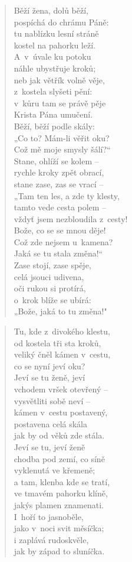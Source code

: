 \begin{verse}
Běží žena, dolů běží, \\
pospíchá do chrámu Páně: \\
tu nablízku lesní stráně \\
kostel na pahorku leží. \\
A~v~úvale ku potoku \\
náhle ubystřuje kroků; \\
neb jak větřík volně věje, \\
z~kostela slyšeti pění: \\
v~kůru tam se právě pěje \\
Krista Pána umučení. \\
Běží, běží podle skály: \\
„Co to? Mám-li věřit oku? \\
Což mě moje smysly šálí?“ \\
Stane, ohlíží se kolem -- \\
rychle kroky zpět obrací, \\
stane zase, zas se vrací -- \\
„Tam ten les, a zde ty klesty, \\
tamto vede cesta polem -- \\
vždyť jsem nezbloudila z~cesty! \\
Bože, co se se mnou děje! \\
Což zde nejsem u~kamena? \\
Jaká se tu stala změna!“ \\
Zase stojí, zase spěje, \\
celá jsouci udivena, \\
oči rukou si protírá, \\
o~krok blíže se ubírá: \\
„Bože, jaká to tu změna!"
\end{verse}

\begin{verse}
Tu, kde z~divokého klestu, \\
od kostela tři sta kroků, \\
veliký čněl kámen v~cestu, \\
co se nyní jeví oku? \\
Jeví se tu ženě, jeví \\
vchodem vršek otevřený -- \\
vysvětliti sobě neví -- \\
kámen v~cestu postavený, \\
postavena celá skála \\
jak by od věků zde stála. \\
Jeví se tu, jeví ženě \\
chodba pod zemí, co síně \\
vyklenutá ve křemeně; \\
a tam, klenba kde se tratí, \\
ve tmavém pahorku klíně, \\
jakýs plamen znamenati. \\
I~hoří to jasnoběle, \\
jako v~noci svit měsíčka; \\
i zaplává rudoskvěle, \\
jak by západ to sluníčka.
\end{verse}

